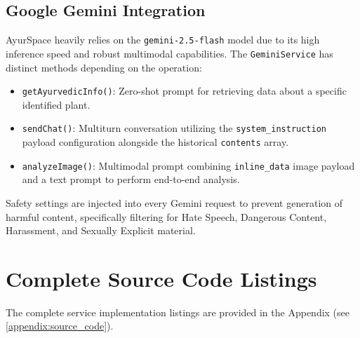 \subsection{Google Gemini Integration}
AyurSpace heavily relies on the \texttt{gemini-2.5-flash} model due to its high inference speed and robust multimodal capabilities. The \texttt{GeminiService} has distinct methods depending on the operation:
\begin{itemize}
    \item \texttt{getAyurvedicInfo()}: Zero-shot prompt for retrieving data about a specific identified plant.
    \item \texttt{sendChat()}: Multiturn conversation utilizing the \texttt{system\_instruction} payload configuration alongside the historical \texttt{contents} array.
    \item \texttt{analyzeImage()}: Multimodal prompt combining \texttt{inline\_data} image payload and a text prompt to perform end-to-end analysis.
\end{itemize}

Safety settings are injected into every Gemini request to prevent generation of harmful content, specifically filtering for Hate Speech, Dangerous Content, Harassment, and Sexually Explicit material.

\newpage
\section{Complete Source Code Listings}
\justify
The complete service implementation listings are provided in the Appendix (see \ref{appendix:source_code}).



